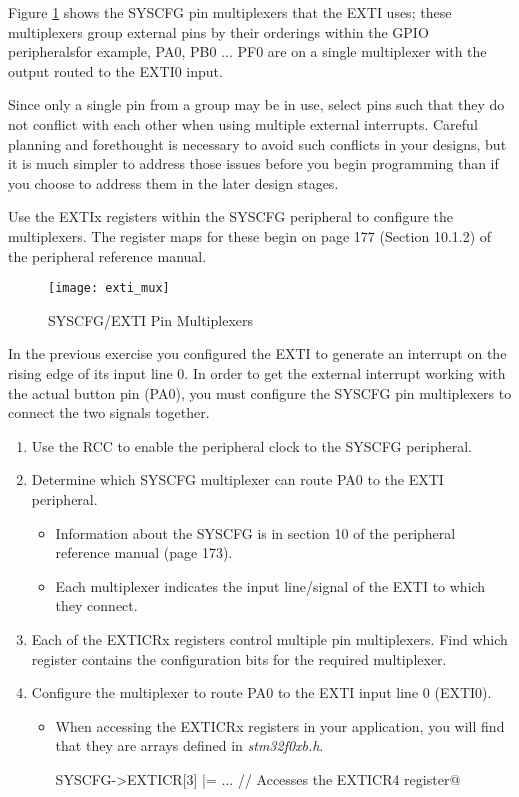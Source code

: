 \documentclass[11pt,fleqn]{book} %
\makeatletter
\newcommand{\ilcode}[1]{
    \smallskip
    \colorbox{gray!20!white}{
        \centering
        \parbox{\linewidth-2\fboxsep}{
            \lstinline@#1@
        }
    }
}
\makeatother
\begin{document}
Figure \ref{exti_mux} shows the SYSCFG pin multiplexers that the EXTI uses; these multiplexers group external pins by their orderings within the GPIO peripherals\textemdash for example, PA0, PB0 ... PF0 are on a single multiplexer with the output routed to the EXTI0 input. 

\begin{warning}Since only a single pin from a group may be in use, select pins such that they do not conflict with each other when using multiple external interrupts. Careful planning and forethought is necessary to avoid such conflicts in your designs, but it is much simpler to address those issues before you begin programming than if you choose to address them in the later design stages.
\end{warning}

Use the EXTIx registers within the SYSCFG peripheral to configure the multiplexers. The register maps for these begin on page 177 (Section 10.1.2) of the peripheral reference manual. 

\begin{figure}[]
    \centering\texttt{[image: exti\_mux]}
    \caption{SYSCFG/EXTI Pin Multiplexers}
    \label{exti_mux}
\end{figure}

\begin{exercise}
    \label{ex3}
    In the previous exercise you configured the EXTI to generate an interrupt on the rising edge of its input line 0. In order to get the external interrupt working with the actual button pin (PA0), you must configure the SYSCFG pin multiplexers to connect the two signals together. 
    \begin{enumerate}
        \item Use the RCC to enable the peripheral clock to the SYSCFG peripheral.
        \item Determine which SYSCFG multiplexer can route PA0 to the EXTI peripheral.
        \begin{itemize}
            \item Information about the SYSCFG is in section 10 of the peripheral reference manual (page 173).
            \item Each multiplexer indicates the input line/signal of the EXTI to which they connect.
        \end{itemize}
        \item Each of the EXTICRx registers control multiple pin multiplexers. Find which register contains the configuration bits for the required multiplexer. 
        \item Configure the multiplexer to route PA0 to the EXTI input line 0 (EXTI0).
        \begin{itemize}
            \item When accessing the EXTICRx registers in your application, you will find that they are arrays defined in \textit{stm32f0xb.h}. \\
            \ilcode{SYSCFG->EXTICR[3] |= ...   // Accesses the EXTICR4 register}
        \end{itemize} 
    \end{enumerate}
\end{exercise}
\end{document}
